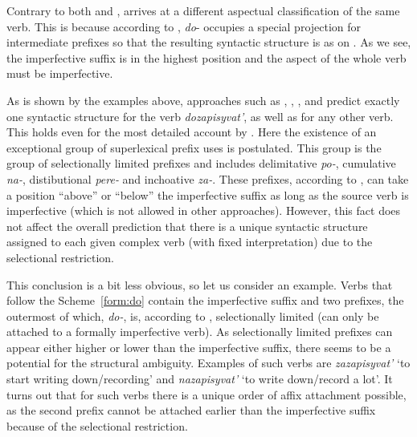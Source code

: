 Contrary to both \citet{Svenonius:04b} and \citet{Ramchand:04}, \citet{Tatevosov:07} arrives at a different aspectual classification of the same verb. This is because according to \citet{Tatevosov:07}, \textit{do}- occupies a special projection for intermediate prefixes so that the resulting syntactic structure is as on . As we see, the imperfective suffix is in the highest position and the aspect of the whole verb must be imperfective. 

As is shown by the examples above, approaches such as \citet{Svenonius:04b}, \citet{Ramchand:04}, \citet{Romanova:06}, and \citet{Tatevosov:07} predict exactly one syntactic structure for the verb \textit{dozapisyvat'}, as well as for any other verb. This holds even for the most detailed account by \cite{Tatevosov:09}. Here the existence of an exceptional group of superlexical prefix uses is postulated. This group is the group of selectionally limited prefixes and includes delimitative \textit{po-}, cumulative \textit{na-}, distibutional \textit{pere-} and inchoative \textit{za-}. These prefixes, according to \citet{Tatevosov:09}, can take a position ``above'' or ``below'' the imperfective suffix as long as the source verb is imperfective (which is not allowed in other approaches). However, this fact does not affect the overall prediction that there is a unique syntactic structure assigned to each given complex verb (with fixed interpretation) due to the selectional restriction.

This conclusion is a bit less obvious, so let us consider an example. Verbs that follow the Scheme~\ref{form:do} contain the imperfective suffix and two prefixes, the outermost of which, \textit{do-}, is, according to \citet{Tatevosov:09}, selectionally limited (can only be attached to a formally imperfective verb). As selectionally limited prefixes can appear either higher or lower than the imperfective suffix, there seems to be a potential for the structural ambiguity. Examples of such verbs are \textit{zazapisyvat'} `to start writing down/recording' and  \textit{nazapisyvat'} `to write down/record a lot'. It turns out that for such verbs there is a unique order of affix attachment possible, as the second prefix cannot be attached earlier than the imperfective suffix because of the selectional restriction.

